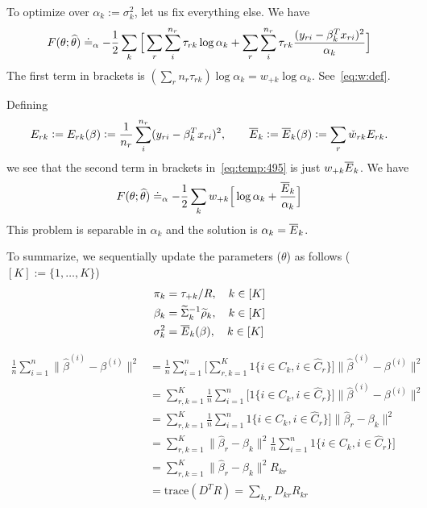 \documentclass[12pt]{article}
\begin{document}
\begin{appendices}
	\bigskip
	To optimize over $\alpha_k:=\sigma_k^2$, let us fix everything else. We have
	\begin{align}\label{eq:temp:495}
	    F(\theta;\widehat\theta) \doteq_{\alpha} -\frac12 \sum_k \Big[ \sum_r \sum_i^{n_r} \tau_{rk} \log \alpha_k + \sum_r \sum_i^{n_r} 
	    \tau_{rk}\frac{(y_{ri} - \beta_k^T x_{ri})^2}{\alpha_k}\Big]
	\end{align}
	The first term in brackets is
	 $(\sum_r n_r \tau_{rk}) \log \alpha_k = w_{+k} \log \alpha_k$. See~\eqref{eq:w:def}.
	
	Defining
	\begin{align}
	    E_{rk} := E_{rk}(\beta) := \frac1{n_r}\sum_{i}^{n_r}   (y_{ri} - \beta_k^T x_{ri})^2, \qquad 
	    \overline{E}_k := \overline{E}_k(\beta) := \sum_r \check w_{rk} E_{rk}.
	\end{align}
	we see that the second term in brackets in~\eqref{eq:temp:495} is just $w_{+k}\overline{E}_k$. We have
	\begin{align}
	     F(\theta;\widehat\theta)   \doteq_{\alpha}
	     -\frac12 \sum_k w_{+k} \Big[  \log \alpha_k + \frac{\overline{E}_k}{\alpha_k}\Big]
	\end{align}
	This problem is separable in $\alpha_k$ and the solution is $\alpha_k = \overline{E}_k$.

	\medskip
	To summarize, we sequentially update the parameters ($\theta$) as follows ($[K] := \{1,\dots,K\}$)
	\begin{align}
	    \pi_k &= \tau_{+k}/R, \quad k \in [K] \\
	    \beta_k &= \widetilde{\Sigma}_k^{-1} \widetilde{\rho}_k,\quad  k \in [K] \\
	    \sigma^2_k &= \overline{E}_k(\beta), \quad k \in [K]
	\end{align}
\end{appendices}

\begin{align}
	\frac1n \sum_{i=1}^n \| \hat\beta^{(i)} - \beta^{(i)} \|^2 
		&=\frac1n \sum_{i=1}^n\Big[
		\sum_{r,k=1}^K  1\{ i \in C_k,  i \in \hat  C_r\}\Big] 
		\| \hat\beta^{(i)} - \beta^{(i)} \|^2\\
		&= \sum_{r,k=1}^K 	\frac1n \sum_{i=1}^n \Big[1\{ i \in C_k,  i \in \hat  C_r\}\Big]
	\| \hat\beta^{(i)} - \beta^{(i)} \|^2 \\
		&= \sum_{r,k=1}^K 	\frac1n \sum_{i=1}^n 1\{ i \in C_k,  i \in \hat  C_r\}\Big] 
		\| \hat\beta_r - \beta_k \|^2 \\
	   &=	 \sum_{r,k=1}^K 	\| \hat\beta_r - \beta_k \|^2	\frac1n \sum_{i=1}^n 1\{ i \in C_k,  i \in \hat  C_r\}\Big] 
	   \\ &= \sum_{r,k=1}^K 	\| \hat\beta_r - \beta_k \|^2 R_{kr} \\
	   &= \text{trace}(D^T R) = \sum_{k,r} D_{kr} R_{kr}
\end{align}
\end{document}
